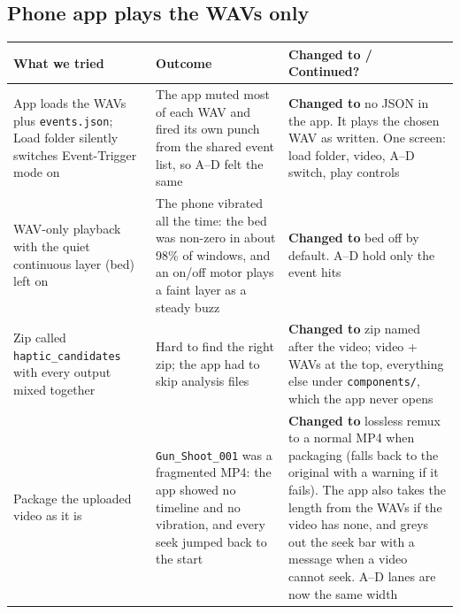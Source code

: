 \documentclass[11pt,a4paper]{article}
\begin{document}
\subsection*{Phone app plays the WAVs only}
\begin{center}
\small
\begin{tabularx}{\textwidth}{@{}>{\raggedright\arraybackslash}p{4cm}>{\raggedright\arraybackslash}p{4cm}>{\raggedright\arraybackslash}X@{}}
\toprule
\textbf{What we tried} & \textbf{Outcome} & \textbf{Changed to / Continued?} \\
\midrule
App loads the WAVs plus \texttt{events.json}; Load folder silently switches Event-Trigger mode on & The app muted most of each WAV and fired its own punch from the shared event list, so A--D felt the same & \textbf{Changed to} no JSON in the app. It plays the chosen WAV as written. One screen: load folder, video, A--D switch, play controls \\
\addlinespace
WAV-only playback with the quiet continuous layer (bed) left on & The phone vibrated all the time: the bed was non-zero in about 98\% of windows, and an on/off motor plays a faint layer as a steady buzz & \textbf{Changed to} bed off by default. A--D hold only the event hits \\
\addlinespace
Zip called \texttt{haptic\_candidates} with every output mixed together & Hard to find the right zip; the app had to skip analysis files & \textbf{Changed to} zip named after the video; video + WAVs at the top, everything else under \texttt{components/}, which the app never opens \\
\addlinespace
Package the uploaded video as it is & \texttt{Gun\_Shoot\_001} was a fragmented MP4: the app showed no timeline and no vibration, and every seek jumped back to the start & \textbf{Changed to} lossless remux to a normal MP4 when packaging (falls back to the original with a warning if it fails). The app also takes the length from the WAVs if the video has none, and greys out the seek bar with a message when a video cannot seek. A--D lanes are now the same width \\
\bottomrule
\end{tabularx}
\end{center}
\end{document}
